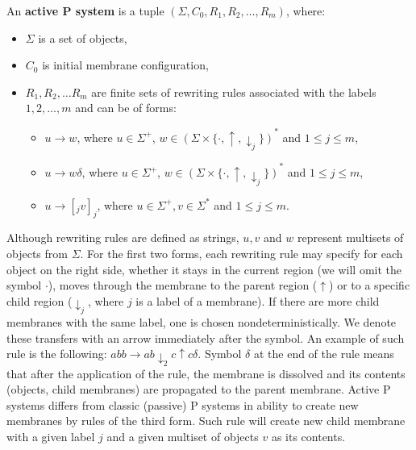\begin{definition}
  \label{def:active_p_system}
  An {\bf active P system} is a tuple $(\Sigma, C_0, R_1, R_2, \dots , R_m)$, where:
  \begin{itemize}
    \item $\Sigma$ is a set of objects,
    \item $C_0$ is initial membrane configuration,
    \item $R_1,R_2,\dots R_m$ are finite sets of rewriting rules associated with the labels $1,2,\dots,m$ and can be of forms:
    \begin{itemize}
      \item $u\rightarrow w$, where $u\in \Sigma^+$, $w\in (\Sigma\times\{\cdot, \uparrow, \downarrow_j\})^*$ and $1\leq j\leq m$,
      \item $u\rightarrow w\delta$, where $u\in \Sigma^+$, $w\in (\Sigma\times\{\cdot, \uparrow, \downarrow_j\})^*$ and $1\leq j\leq m$,
      \item $u\rightarrow [_j v]_j$, where $u\in \Sigma^+, v\in \Sigma^*$ and $1\leq j\leq m$.
    \end{itemize}
  \end{itemize}
\end{definition}

Although rewriting rules are defined as strings, $u,v$ and $w$ represent multisets of objects from $\Sigma$. For the first two forms, each rewriting rule may specify for each object on the right side, whether it stays in the current region (we will omit the symbol $\cdot$), moves through the membrane to the parent region ($\uparrow$)
or to a specific child region ($\downarrow_j$, where $j$ is a label of a membrane). If there are more child membranes with the same label, one is chosen nondeterministically.
We denote these transfers with an arrow immediately after the symbol.
An example of such rule is the following: $abb\rightarrow ab\downarrow_2 c\uparrow c\delta$.
Symbol $\delta$ at the end of the rule means that after the application of the rule, the membrane is dissolved and its contents (objects, child membranes) are propagated to the parent membrane.
Active P systems differs from classic (passive) P systems in ability to create new membranes by rules of the third form. Such rule will create new child membrane with a given label $j$ and a given multiset of objects $v$ as its contents.


